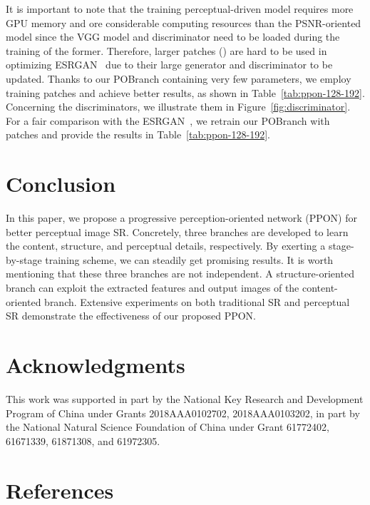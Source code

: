 \documentclass[preprint]{elsarticle}
\begin{document}
It is important to note that the training perceptual-driven model requires more GPU memory and ore considerable computing resources than the PSNR-oriented model since the VGG model and discriminator need to be loaded during the training of the former. Therefore, larger patches () are hard to be used in optimizing ESRGAN~\cite{ESRGAN} due to their large generator and discriminator to be updated. Thanks to our POBranch containing very few parameters, we employ  training patches and achieve better results, as shown in Table~\ref{tab:ppon-128-192}. Concerning the discriminators, we illustrate them in Figure~\ref{fig:discriminator}. For a fair comparison with the ESRGAN~\cite{ESRGAN}, we retrain our POBranch with  patches and provide the results in Table~\ref{tab:ppon-128-192}. 

\begin{figure*}[htpb]
	\centering
	\hfil
	\caption{The network structure of the discriminators. The output size is scaled down by stride 2, and the parameter of LReLU is .}
	\label{fig:discriminator}
\end{figure*}


\section{Conclusion}\label{sec:conclusion}

In this paper, we propose a progressive perception-oriented network (PPON) for better perceptual image SR. Concretely, three branches are developed to learn the content, structure, and perceptual details, respectively. By exerting a stage-by-stage training scheme, we can steadily get promising results.  It is worth mentioning that these three branches are not independent. A structure-oriented branch can exploit the extracted features and output images of the content-oriented branch. Extensive experiments on both traditional SR and perceptual SR demonstrate the effectiveness of our proposed PPON. 

\section*{Acknowledgments}
This work was supported in part by the National Key Research and Development Program of China under Grants 2018AAA0102702, 2018AAA0103202, in part by the National Natural Science Foundation of China under Grant 61772402, 61671339, 61871308, and 61972305.

\section*{References}


\end{document}
